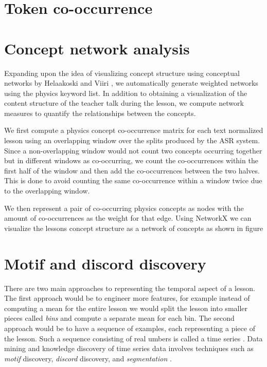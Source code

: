 \documentclass[utf8,english]{gradu3}
\begin{document}

\section{Token co-occurrence}


\section{Concept network analysis}

Expanding upon the idea of visualizing concept structure using conceptual networks by Helaakoski and Viiri \parencite*{helaakoskiContentContentStructure2014}, we automatically generate weighted networks using the physics keyword list. In addition to obtaining a visualization of the content structure of the teacher talk during the lesson, we compute network measures to quantify the relationships between the concepts.

We first compute a physics concept co-occurrence matrix for each text normalized lesson using an overlapping window over the splits produced by the ASR system. Since a non-overlapping window would not count two concepts occurring together but in different windows as co-occurring, we count the co-occurrences within the first half of the window and then add the co-occurrences between the two halves. This is done to avoid counting the same co-occurrence within a window twice due to the overlapping window.

We then represent a pair of co-occurring physics concepts as nodes with the amount of co-occurrences as the weight for that edge. Using NetworkX \parencite{hagbergExploringNetworkStructure2008} we can visualize the lessons concept structure as a network of concepts as shown in figure %


\section{Motif and discord discovery}
There are two main approaches to representing the temporal aspect of a lesson. The first approach would be to engineer more features, for example instead of computing a mean for the entire lesson we would split the lesson into smaller pieces called \emph{bins} and compute a separate mean for each bin. The second approach would be to have a sequence of examples, each representing a piece of the lesson. Such a sequence consisting of real umbers is called a time series \parencite{yehMatrixProfileVI2017}. Data mining and knowledge discovery of time series data involves techniques such as \emph{motif} discovery, \emph{discord} discovery, and \emph{segmentation} \parencite{yehUniversalTimeSeries2018}.
\end{document}
